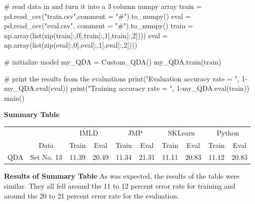 \documentclass{article}
\begin{document}
\begin{flushleft}
\begin{python}
        # read data in and turn it into a 3 column numpy array
        train = pd.read_csv("train.csv",comment = "#").to_numpy()
        eval = pd.read_csv("eval.csv", comment = "#").to_numpy()
        train = np.array(list(zip(train[:,0],train[:,1],train[:,2])))
        eval = np.array(list(zip(eval[:,0],eval[:,1],eval[:,2])))

        # initialize model
        my_QDA = Custom_QDA()
        my_QDA.train(train)
        
        # print the results from the evaluations
        print("Evaluation accuracy rate = ", 1-my_QDA.eval(eval))
        print("Training accuracy rate = ", 1-my_QDA.eval(train))
main()
\end{python}
\textbf{Summary Table}\break
\break
\end{flushleft}
\centering
\begin{tabular}{|c| c| c| c| c| c| c| c| c| c|}
\hline
\rowcolor{gray!20}
 &  & \multicolumn{2}{|c|}{IMLD} & \multicolumn{2}{|c|}{JMP} & \multicolumn{2}{|c|}{SKLearn} & \multicolumn{2}{|c|}{Python}\\\cline{3-10}
\rowcolor{gray!20}
\multirow{-2}{*}{Algorithm}&\multirow{-2}{*}{Data}& \multicolumn{1}{|c|}{Train} & \multicolumn{1}{|c|}{Eval} & \multicolumn{1}{|c|}{Train} & \multicolumn{1}{|c|}{Eval}& \multicolumn{1}{|c|}{Train} & \multicolumn{1}{|c|}{Eval}& \multicolumn{1}{|c|}{Train} & \multicolumn{1}{|c|}{Eval}\\
\hline
QDA & Set No. 13 & 11.39 & 20.49 & 11.34 & 21.31 & 11.11 & 20.83 & 11.12 & 20.83\\
\hline 
\end{tabular}


\begin{flushleft}
\textbf{Results of Summary Table}\break
\break
As was expected, the results of the table were similar. They all fell around the 11 to 12 percent error rate for training and around the 20 to 21 percent error rate for the evaluation.
\end{flushleft}
\end{document}
